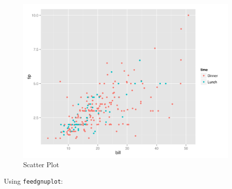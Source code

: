 \documentclass[
]{book}
\theoremstyle{definition}
\theoremstyle{definition}
\theoremstyle{definition}
\theoremstyle{remark}
\begin{document}
\begin{figure}

{\centering \includegraphics[width=32.81in]{images/rio-scatterplot} 

}

\caption{Scatter Plot}\label{fig:unnamed-chunk-32}
\end{figure}

Using \texttt{feedgnuplot}:
\end{document}
